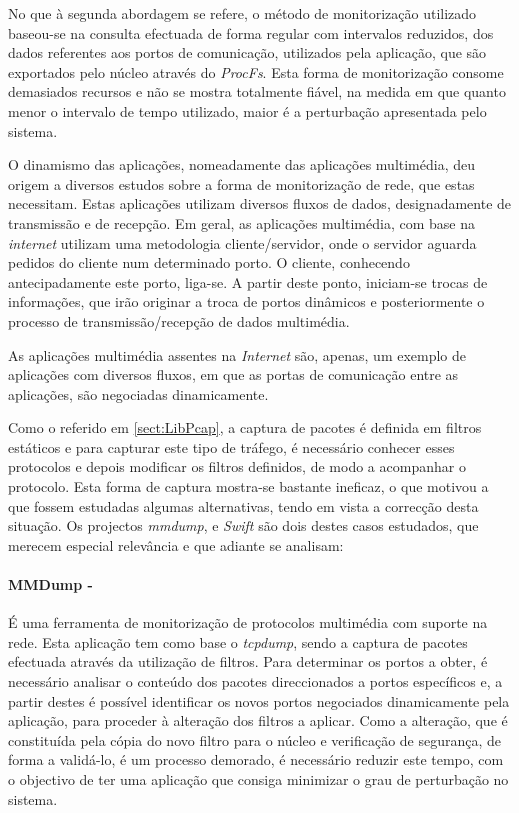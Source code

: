 No que à segunda abordagem se refere, o método de monitorização utilizado baseou-se na consulta efectuada de forma regular com intervalos reduzidos, dos dados referentes aos portos de comunicação, utilizados pela aplicação, que são exportados pelo núcleo através do \textit{ProcFs}.
Esta forma de monitorização consome demasiados recursos e não se mostra totalmente fiável, na medida em que quanto menor o intervalo de tempo utilizado, maior é a perturbação apresentada pelo sistema.

O dinamismo das aplicações, nomeadamente das aplicações multimédia, deu origem a diversos estudos sobre a forma de monitorização de rede, que estas necessitam.
Estas aplicações utilizam diversos fluxos de dados, designadamente de transmissão e de recepção.
Em geral, as aplicações multimédia, com base na \textit{internet} utilizam uma metodologia cliente/servidor, onde o servidor aguarda pedidos do cliente num determinado porto.
O cliente, conhecendo antecipadamente este porto, liga-se.
A partir deste ponto, iniciam-se trocas de informações, que irão originar a troca de portos dinâmicos e posteriormente o processo de transmissão/recepção de dados multimédia.

As aplicações multimédia assentes na \textit{Internet} são, apenas, um exemplo de aplicações com diversos fluxos, em que as portas de comunicação entre as aplicações, são negociadas dinamicamente.

Como o referido em \ref{sect:LibPcap}, a captura de pacotes é definida em filtros estáticos e para capturar este tipo de tráfego, é necessário conhecer esses protocolos e depois modificar os filtros definidos, de modo a acompanhar o protocolo.
Esta forma de captura mostra-se bastante ineficaz, o que motivou a que fossem estudadas algumas alternativas, tendo em vista a correcção desta situação.
Os projectos \textit{mmdump}\cite{505678}, %
e \textit{Swift}\cite{1387609} são dois destes casos estudados, que merecem especial relevância e que adiante se analisam:

\paragraph*{MMDump - } É uma ferramenta de monitorização de protocolos multimédia com suporte na rede.
Esta aplicação tem como base o \textit{tcpdump}, sendo a captura de pacotes efectuada através da utilização de filtros.
Para determinar os portos a obter, é necessário analisar o conteúdo dos pacotes direccionados a portos específicos e, a partir destes é possível identificar os novos portos negociados dinamicamente pela aplicação, para proceder à alteração dos filtros a aplicar.
Como a alteração, que é constituída pela cópia do novo filtro para o núcleo e verificação de segurança, de forma a validá-lo, é um processo demorado, é necessário reduzir este tempo, com o objectivo de ter uma aplicação que consiga minimizar o grau de perturbação no sistema.

